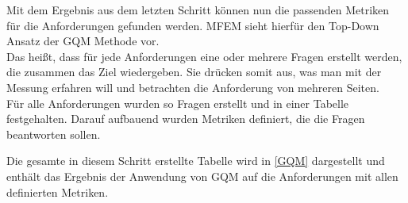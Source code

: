 Mit dem Ergebnis aus dem letzten Schritt können nun die passenden Metriken für die Anforderungen gefunden werden. \ac{MFEM} sieht hierfür den Top-Down Ansatz der \ac{GQM} Methode vor.\\
Das heißt, dass für jede Anforderungen eine oder mehrere Fragen erstellt werden, die zusammen das Ziel wiedergeben. Sie drücken somit aus, was man mit der Messung erfahren will und betrachten die Anforderung von mehreren Seiten.\\
Für alle Anforderungen wurden so Fragen erstellt und in einer Tabelle festgehalten. Darauf aufbauend wurden Metriken definiert, die die Fragen beantworten sollen.

Die gesamte in diesem Schritt erstellte Tabelle wird in \ref{GQM} dargestellt und enthält das Ergebnis der Anwendung von \ac{GQM} auf die Anforderungen mit allen definierten Metriken.  

